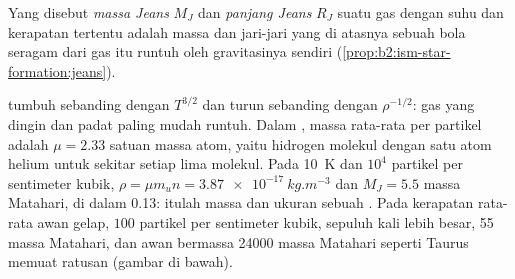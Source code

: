 \begin{definition}\label{def:b2:ism-star-formation:jeans}
Yang disebut \emph{massa Jeans} $M_J$ dan \emph{panjang
Jeans} $R_J$ suatu gas dengan suhu dan kerapatan tertentu
adalah massa dan jari-jari yang di atasnya sebuah bola seragam dari gas itu
runtuh oleh gravitasinya sendiri (\cref{prop:b2:ism-star-formation:jeans}).
\end{definition}

 tumbuh sebanding dengan $T^{3/2}$ dan turun sebanding dengan $\rho^{-1/2}$: gas
yang dingin dan padat paling mudah runtuh. Dalam , massa rata-rata per partikel
adalah $\mu = 2.33$ satuan massa atom, yaitu hidrogen molekul dengan satu atom helium untuk
sekitar setiap lima molekul. Pada \qty{10}{K} dan $10^4$ partikel per sentimeter
kubik, $\rho = \mu m_u n = \qty{3.87e-17}{kg.m^{-3}}$ dan
$M_J = 5.5$ massa Matahari, di dalam  \qty{0.13}{\parsec}:
itulah massa dan ukuran sebuah . Pada kerapatan rata-rata awan gelap,
$100$ partikel per sentimeter kubik,  sepuluh kali lebih besar, 55
massa Matahari, dan awan bermassa \num{24000} massa Matahari seperti Taurus memuat
ratusan  (gambar di bawah).

